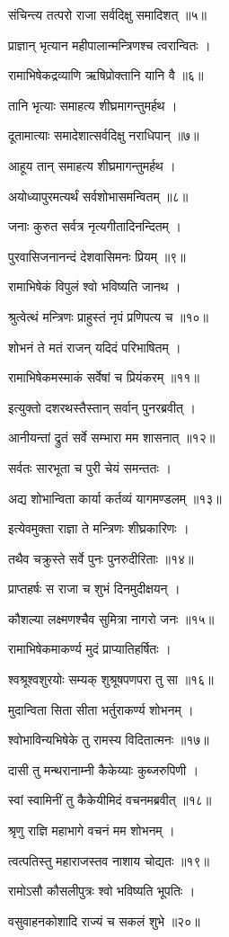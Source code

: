 संचिन्त्य तत्परो राजा सर्वदिक्षु समादिशत् ॥५॥

प्राज्ञान् भृत्यान महीपालान्मन्त्रिणश्च त्वरान्वितः ।

रामाभिषेकद्रव्याणि ऋषिप्रोक्तानि यानि वै ॥६॥

तानि भृत्याः समाहत्य शीघ्रमागन्तुमर्हथ ।

दूतामात्याः समादेशात्सर्वदिक्षु नराधिपान् ॥७॥

आहूय तान् समाहत्य शीघ्रमागन्तुमर्हथ ।

अयोध्यापुरमत्यर्थं सर्वशोभासमन्वितम् ॥८॥

जनाः कुरुत सर्वत्र नृत्यगीतादिनन्दितम् ।

पुरवासिजनानन्दं देशवासिमनः प्रियम् ॥९॥

रामाभिषेकं विपुलं श्वो भविष्यति जानथ ।

श्रुत्वेत्थं मन्त्रिणः प्राहुस्तं नृपं प्रणिपत्य च ॥१०॥

शोभनं ते मतं राजन् यदिदं परिभाषितम् ।

रामाभिषेकमस्माकं सर्वेषां च प्रियंकरम् ॥११॥

इत्युक्तो दशरथस्तैस्तान् सर्वान् पुनरब्रवीत् ।

आनीयन्तां द्रुतं सर्वे सम्भारा मम शासनात् ॥१२॥

सर्वतः सारभूता च पुरी चेयं समन्ततः ।

अद्य शोभान्विता कार्या कर्तव्यं यागमण्डलम् ॥१३॥

इत्येवमुक्ता राज्ञा ते मन्त्रिणः शीघ्रकारिणः ।

तथैव चक्रुस्ते सर्वे पुनः पुनरुदीरिताः ॥१४॥

प्राप्तहर्षः स राजा च शुभं दिनमुदीक्षयन् ।

कौशल्या लक्ष्मणश्चैव सुमित्रा नागरो जनः ॥१५॥

रामाभिषेकमाकर्ण्य मुदं प्राप्यातिहर्षितः ।

श्वश्रूश्वशुरयोः सम्यक् शुश्रूषपणपरा तु सा ॥१६॥

मुदान्विता सिता सीता भर्तुराकर्ण्य शोभनम् ।

श्वोभाविन्यभिषेके तु रामस्य विदितात्मनः ॥१७॥

दासी तु मन्थरानाम्नी कैकेय्याः कुब्जरुपिणी ।

स्वां स्वामिनीं तु कैकेयीमिदं वचनमब्रवीत् ॥१८॥

श्रृणु राज्ञि महाभागे वचनं मम शोभनम् ।

त्वत्पतिस्तु महाराजस्तव नाशाय चोद्यतः ॥१९॥

रामोऽसौ कौसलीपुत्रः श्वो भविष्यति भूपतिः ।

वसुवाहनकोशादि राज्यं च सकलं शुभे ॥२०॥

